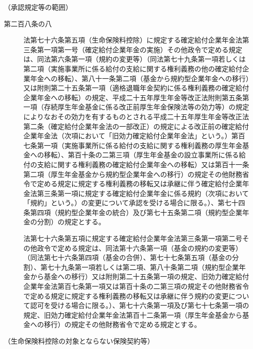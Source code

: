 \documentclass[twocolumn,a4j,10pt]{ltjtarticle}
\begin{document}
\noindent\hspace{10pt}（承認規定等の範囲）
\begin{description}
\item[第二百八条の八]法第七十六条第五項（生命保険料控除）に規定する確定給付企業年金法第三条第一項第一号（確定給付企業年金の実施）その他政令で定める規定は、同法第六条第一項（規約の変更等）（同法第七十九条第一項若しくは第二項（実施事業所に係る給付の支給に関する権利義務の他の確定給付企業年金への移転）、第八十一条第二項（基金から規約型企業年金への移行）又は附則第二十五条第一項（適格退職年金契約に係る権利義務の確定給付企業年金への移転）の規定、平成二十五年厚生年金等改正法附則第五条第一項（存続厚生年金基金に係る改正前厚生年金保険法等の効力等）の規定によりなおその効力を有するものとされる平成二十五年厚生年金等改正法第二条（確定給付企業年金法の一部改正）の規定による改正前の確定給付企業年金法（次項において「旧効力確定給付企業年金法」という。）第百七条第一項（実施事業所に係る給付の支給に関する権利義務の厚生年金基金への移転）、第百十条の二第三項（厚生年金基金の設立事業所に係る給付の支給に関する権利義務の確定給付企業年金への移転）又は第百十一条第二項（厚生年金基金から規約型企業年金への移行）の規定その他財務省令で定める規定に規定する権利義務の移転又は承継に伴う確定給付企業年金法第三条第一項に規定する確定給付企業年金に係る規約（次項において「規約」という。）の変更について承認を受ける場合に限る。）、第七十四条第四項（規約型企業年金の統合）及び第七十五条第二項（規約型企業年金の分割）の規定とする。
\item[]法第七十六条第五項に規定する確定給付企業年金法第三条第一項第二号その他政令で定める規定は、同法第十六条第一項（基金の規約の変更等）（同法第七十六条第四項（基金の合併）、第七十七条第五項（基金の分割）、第七十九条第一項若しくは第二項、第八十条第二項（規約型企業年金から基金への移行）又は附則第二十五条第一項の規定、旧効力確定給付企業年金法第百七条第一項又は第百十条の二第三項の規定その他財務省令で定める規定に規定する権利義務の移転又は承継に伴う規約の変更について認可を受ける場合に限る。）、第七十六条第一項及び第七十七条第一項の規定、旧効力確定給付企業年金法第百十二条第一項（厚生年金基金から基金への移行）の規定その他財務省令で定める規定とする。
\end{description}
\noindent\hspace{10pt}（生命保険料控除の対象とならない保険契約等）
\end{document}
